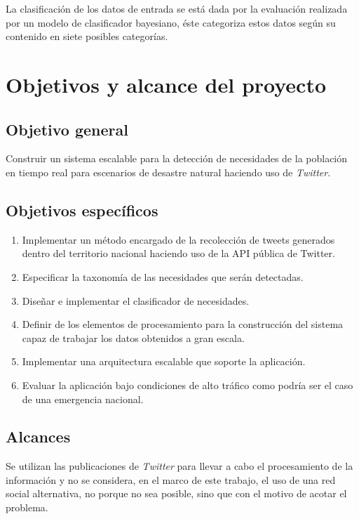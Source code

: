 La clasificación de los datos de entrada se está dada por la evaluación realizada por un modelo de clasificador bayesiano, éste categoriza estos datos según su contenido en siete posibles categorías.

\section{Objetivos y alcance del proyecto}
\label{intro:objetivos}

\subsection{Objetivo general}
	Construir un sistema escalable para la detección de necesidades de la población en tiempo real para escenarios de desastre natural haciendo uso de \textit{Twitter}.

\subsection{Objetivos específicos}
\begin{enumerate}
\item	Implementar un método encargado de la recolección de tweets generados dentro del territorio nacional haciendo uso de la API pública de Twitter.
\item	Especificar la taxonomía de las necesidades que serán detectadas.
\item	Diseñar e implementar el clasificador de necesidades.
\item	Definir de los elementos de procesamiento para la construcción del sistema capaz de trabajar los datos obtenidos a gran escala.
\item	Implementar una arquitectura escalable que soporte la aplicación.
\item	Evaluar la aplicación bajo condiciones de alto tráfico como podría ser el caso de una emergencia nacional.
\end{enumerate}

\subsection{Alcances}
\label{subsec:alcances}

Se utilizan las publicaciones de \textit{Twitter} para llevar a cabo el procesamiento de la información y no se considera, en el marco de este trabajo, el uso de una red social alternativa, no porque no sea posible, sino que con el motivo de acotar el problema.

